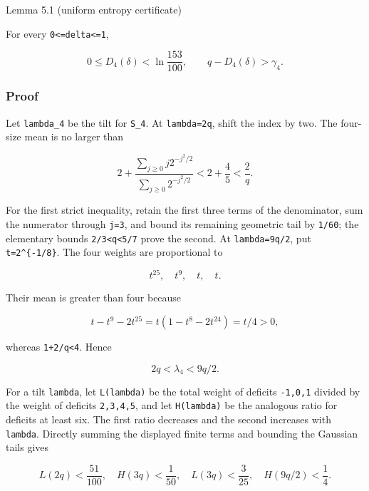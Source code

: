 \documentclass[
  11pt,
  a4paper,
]{article}
\begin{document}
{}
\label{lemma-5.1-uniform-entropy-certificate}
\begin{lemmabox}{Lemma 5.1 (uniform entropy certificate)}

For every \texttt{0\textless{}=delta\textless{}=1},

\[
 0\le D_4(\delta)<\ln\frac{153}{100},\qquad
 q-D_4(\delta)>\gamma_4.                                 \tag{5.3}
\]

\end{lemmabox}

\subsubsection{Proof}\label{proof-2}

Let \texttt{lambda\_4} be the tilt for \texttt{S\_4}. At
\texttt{lambda=2q}, shift the index by two. The four-size mean is no
larger than

\[
 2+\frac{\sum_{j\ge0}j2^{-j^2/2}}
          {\sum_{j\ge0}2^{-j^2/2}}<2+\frac45<\frac2q.    \tag{5.4}
\]

For the first strict inequality, retain the first three terms of the
denominator, sum the numerator through \texttt{j=3}, and bound its
remaining geometric tail by \texttt{1/60}; the elementary bounds
\texttt{2/3\textless{}q\textless{}5/7} prove the second. At
\texttt{lambda=9q/2}, put \texttt{t=2\^{}\{-1/8\}}. The four weights are
proportional to

\[
 t^{25},\quad t^9,\quad t,\quad t.
\]

Their mean is greater than four because

\[
 t-t^9-2t^{25}=t(1-t^8-2t^{24})=t/4>0,                 \tag{5.5}
\]

whereas \texttt{1+2/q\textless{}4}. Hence

\[
 2q<\lambda_4<9q/2.                                     \tag{5.6}
\]

For a tilt \texttt{lambda}, let \texttt{L(lambda)} be the total weight
of deficits \texttt{-1,0,1} divided by the weight of deficits
\texttt{2,3,4,5}, and let \texttt{H(lambda)} be the analogous ratio for
deficits at least six. The first ratio decreases and the second
increases with \texttt{lambda}. Directly summing the displayed finite
terms and bounding the Gaussian tails gives

\[
 L(2q)<\frac{51}{100},\quad H(3q)<\frac1{50},\quad
 L(3q)<\frac3{25},\quad H(9q/2)<\frac14.                 \tag{5.7}
\]
\end{document}
